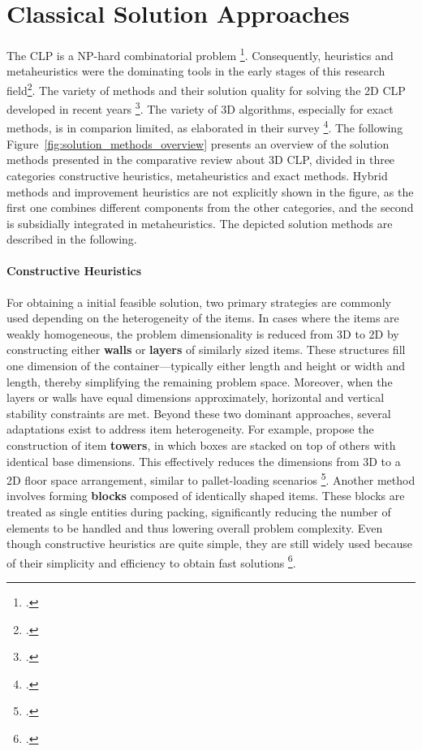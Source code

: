 \chapter{Classical Solution Approaches}
\label{sec:classical_solution_approaches}
The \gls{CLP} is a NP-hard combinatorial problem \footcite[cf.][p.11]{bortfeldt_constraints_2013}.
Consequently, heuristics and metaheuristics were the dominating tools
in the early stages of this research field\footcite[cf.][]{pisinger_heuristics_2002}. The variety of methods
and their solution quality for solving the 2D \gls{CLP} developed in recent years \footcite[cf.][p.23]{iori_exact_2021}.
The variety of 3D algorithms, especially for exact methods, is in comparion limited, as
\citeauthor*{zhao_comparative_2016} elaborated in their survey \footcite[cf.][]{zhao_comparative_2016}.
The following Figure~\ref{fig:solution_methods_overview} presents an overview of the solution methods
presented in the comparative review about 3D \gls{CLP}, divided in three categories constructive heuristics, metaheuristics
and exact methods. Hybrid methods and improvement heuristics are not explicitly shown in the figure,
as the first one combines different components from the other categories, and the second is subsidially
integrated in metaheuristics. The depicted solution methods are described in the following.



\subsubsection{Constructive Heuristics}
For obtaining a initial feasible solution, two primary strategies are commonly
used depending on the heterogeneity of the items. In cases where the items are weakly homogeneous,
the problem dimensionality is reduced from 3D to 2D by constructing either
\textbf{walls} or \textbf{layers} of similarly sized items. These structures fill one
dimension of the container—typically either length and height or width and length, thereby
simplifying the remaining problem space. Moreover, when the layers or walls have
equal dimensions approximately, horizontal and vertical stability constraints are met.
Beyond these two dominant approaches, several adaptations exist to address item heterogeneity.
For example, \citeauthor{gehring_genetic_1997} propose the construction of item
\textbf{towers}, in which boxes are stacked on top of others with identical base dimensions.
This effectively reduces the dimensions from 3D to a 2D floor space arrangement,
similar to pallet-loading scenarios \footcite[cf.][pp. 402--406]{gehring_genetic_1997}.
Another method involves forming \textbf{blocks} composed of identically shaped items.
These blocks are treated as single entities
during packing, significantly reducing the number of elements to be handled and thus
lowering overall problem complexity. Even though constructive heuristics are quite simple,
they are still widely used because of their simplicity and efficiency to obtain fast solutions
\footcite[cf.][pp. 11--13]{tamke_branch-and-cut_2024}.

